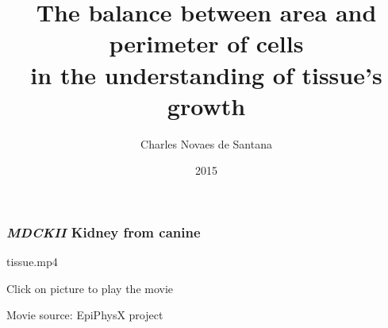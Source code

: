 \documentclass{beamer}
\title{The balance between area and perimeter of cells\\ in the understanding of tissue's growth}
\author{Charles Novaes de Santana}
\date{2015}
\begin{document}
\frame{\maketitle}

\begin{frame}
\frametitle{\textit{MDCKII}  Kidney from canine}

\begin{center}
%
{tissue.mp4} %

Click on picture to play the movie
\end{center}

Movie source: EpiPhysX project
\end{frame}
\end{document}
